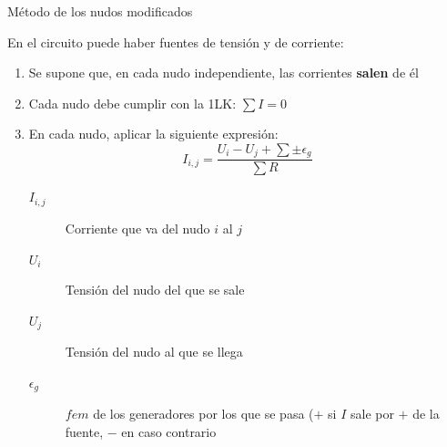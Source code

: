 \documentclass[aspectratio=169, xcolor={usenames,svgnames,dvipsnames}]{beamer}
\begin{document}
\begin{frame}{Método de los nudos modificados}

En el circuito puede haber \alert{fuentes de tensión y de corriente}:
	\begin{enumerate}
	    \item Se supone que, en cada nudo independiente, las corrientes \textbf{salen} de él
	    \item Cada nudo debe cumplir con la 1LK: $\sum I=0$
	    \item En cada nudo, aplicar la siguiente expresión:
	    \begin{equation*}
	        I_{i,j}=\dfrac{U_i-U_j+\sum\pm \epsilon_g}{\sum R}
	    \end{equation*}
	    \begin{description}
	    \item[{$I_{i,j}$}] Corriente que va del nudo $i$ al $j$
	    \item[{$U_i$}] Tensión del nudo del que se sale
	    \item[{$U_j$}] Tensión del nudo al que se llega
	    \item[{$\epsilon_g$}] $fem$ de los generadores por los que se pasa ($+$ si $I$ sale por $+$ de la fuente, $-$ en caso contrario
	    \end{description}
	\end{enumerate}
\end{frame}
\end{document}
